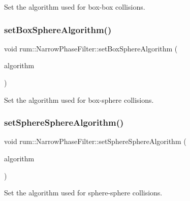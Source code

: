 Set the algorithm used for box-\/box collisions. \mbox{\label{classrum_1_1_narrow_phase_filter_a2420746ba108a35b3f06f7b351abfa5f}} 
\subsubsection{\texorpdfstring{set\+Box\+Sphere\+Algorithm()}{setBoxSphereAlgorithm()}}
{\footnotesize\ttfamily void rum\+::\+Narrow\+Phase\+Filter\+::set\+Box\+Sphere\+Algorithm (\begin{DoxyParamCaption}\item[{\mbox{\hyperlink{classrum_1_1_narrow_phase_filter_a499acd63e16f164dbf1ee7567c1a3e0f}{Algorithm}}$<$ \mbox{\hyperlink{classrum_1_1_i_box_sphere_narrow_algorithm}{I\+Box\+Sphere\+Narrow\+Algorithm}} $>$}]{algorithm }\end{DoxyParamCaption})}

Set the algorithm used for box-\/sphere collisions. \mbox{\label{classrum_1_1_narrow_phase_filter_ad29d02d2db07f650a60e97771b05f325}} 
\subsubsection{\texorpdfstring{set\+Sphere\+Sphere\+Algorithm()}{setSphereSphereAlgorithm()}}
{\footnotesize\ttfamily void rum\+::\+Narrow\+Phase\+Filter\+::set\+Sphere\+Sphere\+Algorithm (\begin{DoxyParamCaption}\item[{\mbox{\hyperlink{classrum_1_1_narrow_phase_filter_a499acd63e16f164dbf1ee7567c1a3e0f}{Algorithm}}$<$ \mbox{\hyperlink{classrum_1_1_i_sphere_sphere_narrow_algorithm}{I\+Sphere\+Sphere\+Narrow\+Algorithm}} $>$}]{algorithm }\end{DoxyParamCaption})}

Set the algorithm used for sphere-\/sphere collisions. 

